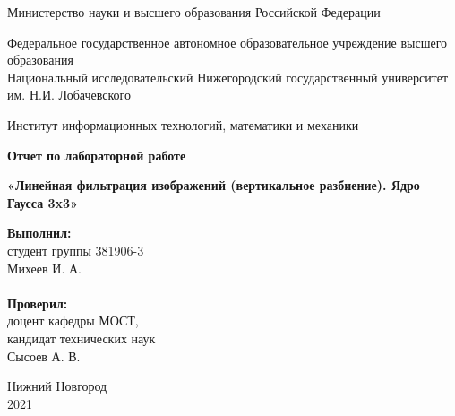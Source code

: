 \documentclass{report}
\begin{document}
\begin{titlepage}

\begin{center}
Министерство науки и высшего образования Российской Федерации
\end{center}

\begin{center}
Федеральное государственное автономное образовательное учреждение высшего образования \\
Национальный исследовательский Нижегородский государственный университет им. Н.И. Лобачевского
\end{center}

\begin{center}
Институт информационных технологий, математики и механики
\end{center}

\vspace{4em}

\begin{center}
\textbf{\Large Отчет по лабораторной работе} \\
\end{center}
\begin{center}
\textbf{\Large «Линейная фильтрация изображений (вертикальное разбиение). Ядро Гаусса 3x3»} \\
\end{center}

\vspace{4em}

\newbox{\lbox}
\newlength{\maxl}
\setlength{\maxl}{\wd\lbox}
\hfill\parbox{7cm}{
\hspace*{5cm}\hspace*{-5cm}\textbf{Выполнил:} \\ студент группы 381906-3 \\ Михеев И. А.\\
\\
\hspace*{5cm}\hspace*{-5cm}\textbf{Проверил:}\\ доцент кафедры МОСТ, \\ кандидат технических наук \\ Сысоев А. В.\\
}
\vspace{\fill}

\begin{center} Нижний Новгород \\ 2021 \end{center}

\end{titlepage}
\end{document}
